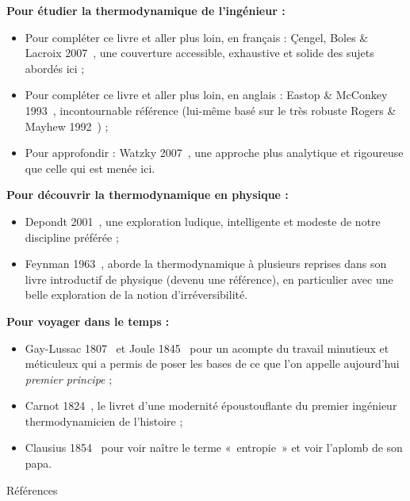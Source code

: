 \textbf{Pour étudier la thermodynamique de l’ingénieur :}

\begin{itemize}
	\item Pour compléter ce livre et aller plus loin, en français : Çengel, Boles \& Lacroix 2007~\mbox{\cite{cengeletal2008en,cengeletal2008fr}}, une couverture accessible, exhaustive et solide des sujets abordés ici ;
	\item Pour compléter ce livre et aller plus loin, en anglais : Eastop \& McConkey 1993~\cite{eastopetal1993}, incontournable référence (lui-même basé sur le très robuste Rogers \& Mayhew 1992~\cite{rogersetal1992}) ;
	\item Pour approfondir : Watzky 2007~\cite{watzky2007}, une approche plus analytique et rigoureuse que celle qui est menée ici.
\end{itemize}

\textbf{Pour découvrir la thermodynamique en physique :}

\begin{itemize}
	\item Depondt 2001~\cite{depondt2001}, une exploration ludique, intelligente et modeste de notre discipline préférée ;
	\item Feynman 1963~\cite{feynman1963,feynman1963fr}, aborde la thermodynamique à plusieurs reprises dans son livre introductif de physique (devenu une référence), en particulier avec une belle exploration de la notion d’irréversibilité.
\end{itemize}

\textbf{Pour voyager dans le temps :}

\begin{itemize}
	\item Gay-Lussac 1807~\cite{gaylussac1807} et Joule 1845~\cite{joule1845} pour un acompte du travail minutieux et méticuleux qui a permis de poser les bases de ce que l’on appelle aujourd’hui \textit{premier principe} ;
	\item Carnot 1824~\cite{carnot1824}, le livret d’une modernité époustouflante du premier ingénieur thermodynamicien de l’histoire ;
	\item Clausius 1854~\cite{clausius1854} pour voir naître le terme «~entropie~» et voir l’aplomb de son papa.
\end{itemize}

{\center \normalsize \Large Références\par}

\printbibliography[heading=none]
